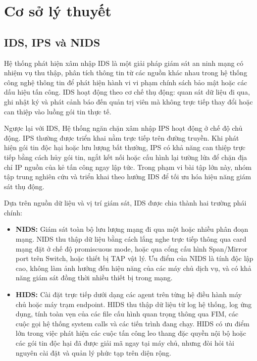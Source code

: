 \clearpage
\chapter{Cơ sở lý thuyết}

\section{IDS, IPS và NIDS}
Hệ thống phát hiện xâm nhập IDS là một giải pháp giám sát an ninh mạng có nhiệm vụ thu thập, phân tích thông tin từ các nguồn khác nhau trong hệ thống công nghệ thông tin để phát hiện hành vi vi phạm chính sách bảo mật hoặc các dấu hiệu tấn công. IDS hoạt động theo cơ chế thụ động: quan sát dữ liệu đi qua, ghi nhật ký và phát cảnh báo đến quản trị viên mà không trực tiếp thay đổi hoặc can thiệp vào luồng gói tin thực tế.

Ngược lại với IDS, Hệ thống ngăn chặn xâm nhập IPS hoạt động ở chế độ chủ động. IPS thường được triển khai nằm trực tiếp trên đường truyền. Khi phát hiện gói tin độc hại hoặc lưu lượng bất thường, IPS có khả năng can thiệp trực tiếp bằng cách hủy gói tin, ngắt kết nối hoặc cấu hình lại tường lửa để chặn địa chỉ IP nguồn của kẻ tấn công ngay lập tức. Trong phạm vi bài tập lớn này, nhóm tập trung nghiên cứu và triển khai theo hướng IDS để tối ưu hóa hiệu năng giám sát thụ động.

Dựa trên nguồn dữ liệu và vị trí giám sát, IDS được chia thành hai trường phái chính:
\begin{itemize}
    \item \textbf{NIDS:} Giám sát toàn bộ lưu lượng mạng đi qua một hoặc nhiều phân đoạn mạng. NIDS thu thập dữ liệu bằng cách lắng nghe trực tiếp thông qua card mạng đặt ở chế độ promiscuous mode, hoặc qua cổng cấu hình Span/Mirror port trên Switch, hoặc thiết bị TAP vật lý. Ưu điểm của NIDS là tính độc lập cao, không làm ảnh hưởng đến hiệu năng của các máy chủ dịch vụ, và có khả năng giám sát đồng thời nhiều thiết bị trong mạng.
    \item \textbf{HIDS:} Cài đặt trực tiếp dưới dạng các agent trên từng hệ điều hành máy chủ hoặc máy trạm endpoint. HIDS thu thập dữ liệu từ log hệ thống, log ứng dụng, tính toàn vẹn của các file cấu hình quan trọng thông qua FIM, các cuộc gọi hệ thống system calls và các tiến trình đang chạy. HIDS có ưu điểm lớn trong việc phát hiện các cuộc tấn công leo thang đặc quyền nội bộ hoặc các gói tin độc hại đã được giải mã ngay tại máy chủ, nhưng đòi hỏi tài nguyên cài đặt và quản lý phức tạp trên diện rộng.
\end{itemize}

